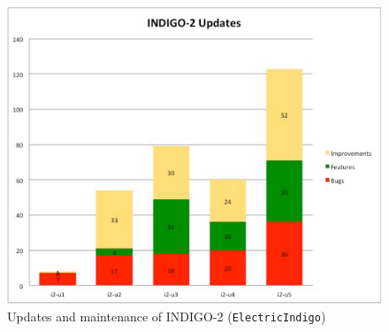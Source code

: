 \documentclass{article}
\begin{document}
\begin{figure}
  \centering
  \includegraphics[width=\textwidth]{./figs/Figure10.pdf}
  \caption{Updates and maintenance of INDIGO-2 ({\tt ElectricIndigo})}
  \label{fig:10}
\end{figure}
\end{document}
